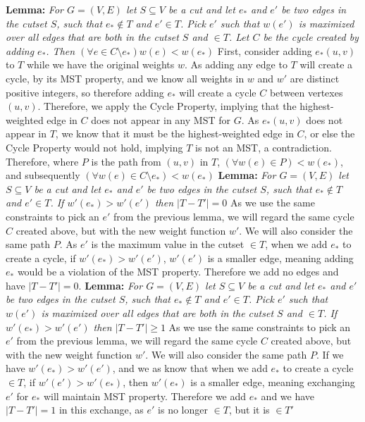 \documentclass{article}
\begin{document}
\textbf{Lemma:} \textit{For $G=(V,E)$ let $S \subseteq V$ be a cut and let $e_*$ and $e'$ be two edges in the cutset $S$, such that $e_* \not\in T$ and $e' \in T$. Pick $e'$ such that $w(e')$ is maximized over all edges that are both in the cutset $S$ and $\in T$. Let $C$ be the cycle created by adding $e_*$. Then $ (\forall e \in C \setminus e_*) w(e)< w(e_*) $}\newline 
First, consider adding $e_*(u,v)$ to $T$ while we have the original weights $w$. As adding any edge to $T$ will create a cycle, by its MST property, and we know all weights in $w$ and $w'$ are distinct positive integers, so therefore adding $e_*$ will create a cycle $C$ between vertexes $(u,v)$. Therefore, we apply the Cycle Property, implying that the highest-weighted edge in $C$ does not appear in any MST for $G$. As $e_*(u,v)$ does not appear in $T$, we know that it must be the highest-weighted edge in $C$, or else the Cycle Property would not hold, implying $T$ is not an MST, a contradiction. Therefore, where $P$ is the path from $(u,v)$ in $T$, $ (\forall w(e) \in P) < w(e_*)$, and subsequently $ (\forall w(e) \in C \setminus e_*) < w(e_*)$ \newline \newline 
\textbf{Lemma:} \textit{For $G=(V,E)$ let $S \subseteq V$ be a cut and let $e_*$ and $e'$ be two edges in the cutset $S$, such that $e_* \not\in T$ and $e' \in T$. If $w'(e_*)>w'(e')$ then $|T-T'| = 0$}\newline 
As we use the same constraints to pick an $e'$ from the previous lemma, we will regard the same cycle $C$ created above, but with the new weight function $w'$. We will also consider the same path $P$. As $e'$ is the maximum value in the cutset $\in T$, when we add $e_*$ to create a cycle, if $w'(e_*)>w'(e')$, $w'(e')$ is a smaller edge, meaning adding $e_*$ would be a violation of the MST property. Therefore we add no edges and have $|T-T'| = 0$. \newline \newline
\textbf{Lemma:} \textit{For $G=(V,E)$ let $S \subseteq V$ be a cut and let $e_*$ and $e'$ be two edges in the cutset $S$, such that $e_* \not\in T$ and $e' \in T$. Pick $e'$ such that $w(e')$ is maximized over all edges that are both in the cutset $S$ and $\in T$. If $w'(e_*)>w'(e')$ then $|T-T'| \geq 1$}\newline
As we use the same constraints to pick an $e'$ from the previous lemma, we will regard the same cycle $C$ created above, but with the new weight function $w'$. We will also consider the same path $P$. If we have $w'(e_*)>w'(e')$, and we as know that when we add $e_*$ to create a cycle $\in T$, if $w'(e')> w'(e_*)$, then $w'(e_*)$ is a smaller edge, meaning exchanging $e'$ for $e_*$ will maintain MST property. Therefore we add $e_*$ and we have $|T-T'| = 1$ in this exchange, as $e'$ is no longer $\in T$, but it is $\in T'$ \newline \newline
\end{document}
